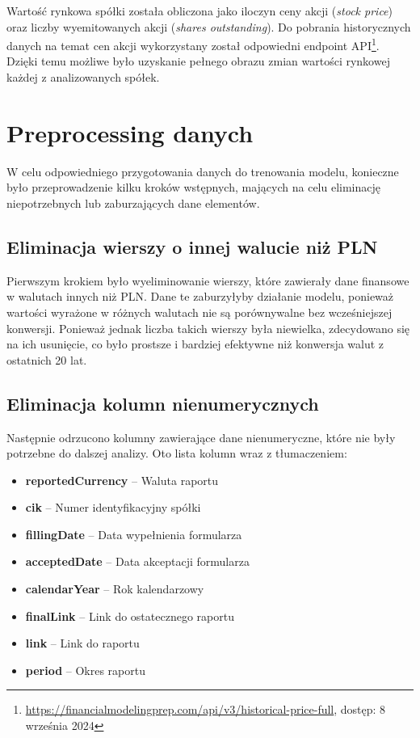 \documentclass[12pt]{article}
\begin{document}
Wartość rynkowa spółki została obliczona jako iloczyn ceny akcji (\emph{stock price}) oraz liczby wyemitowanych akcji (\emph{shares outstanding}). Do pobrania historycznych danych na temat cen akcji wykorzystany został odpowiedni endpoint API\footnote{\url{https://financialmodelingprep.com/api/v3/historical-price-full}, dostęp: 8 września 2024}. Dzięki temu możliwe było uzyskanie pełnego obrazu zmian wartości rynkowej każdej z analizowanych spółek.

\newpage %
\section{Preprocessing danych}

W celu odpowiedniego przygotowania danych do trenowania modelu, konieczne było przeprowadzenie kilku kroków wstępnych, mających na celu eliminację niepotrzebnych lub zaburzających dane elementów.

\subsection{Eliminacja wierszy o innej walucie niż PLN}

Pierwszym krokiem było wyeliminowanie wierszy, które zawierały dane finansowe w walutach innych niż PLN. Dane te zaburzyłyby działanie modelu, ponieważ wartości wyrażone w różnych walutach nie są porównywalne bez wcześniejszej konwersji. Ponieważ jednak liczba takich wierszy była niewielka, zdecydowano się na ich usunięcie, co było prostsze i bardziej efektywne niż konwersja walut z ostatnich 20 lat.

\subsection{Eliminacja kolumn nienumerycznych}

Następnie odrzucono kolumny zawierające dane nienumeryczne, które nie były potrzebne do dalszej analizy. Oto lista kolumn wraz z tłumaczeniem:
\begin{itemize}
    \item \textbf{reportedCurrency} – Waluta raportu
    \item \textbf{cik} – Numer identyfikacyjny spółki
    \item \textbf{fillingDate} – Data wypełnienia formularza
    \item \textbf{acceptedDate} – Data akceptacji formularza
    \item \textbf{calendarYear} – Rok kalendarzowy
    \item \textbf{finalLink} – Link do ostatecznego raportu
    \item \textbf{link} – Link do raportu
    \item \textbf{period} – Okres raportu
\end{itemize}
\end{document}
